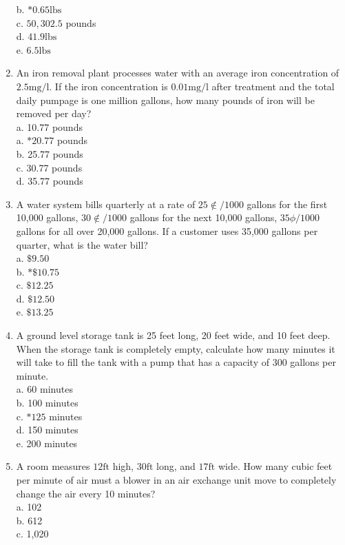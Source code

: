 \begin{enumerate}
b. $* 0.65 \mathrm{lbs}$\\
c. $50,302.5$ pounds\\
d. $41.9 \mathrm{lbs}$\\
e. $6.5 \mathrm{lbs}$\\
\item An iron removal plant processes water with an average iron concentration of $2.5 \mathrm{mg} / \mathrm{l}$. If the iron concentration is $0.01 \mathrm{mg} / \mathrm{l}$ after treatment and the total daily pumpage is one million gallons, how many pounds of iron will be removed per day?\\
a. 10.77 pounds\\
a. $* 20.77$ pounds\\
b. 25.77 pounds\\
c. 30.77 pounds\\
d. 35.77 pounds\\
\item A water system bills quarterly at a rate of $25 \notin / 1000$ gallons for the first 10,000 gallons, $30 \notin / 1000$ gallons for the next 10,000 gallons, $35 \phi / 1000$ gallons for all over 20,000 gallons. If a customer uses 35,000 gallons per quarter, what is the water bill?\\
a. $\$ 9.50$\\
b. $* \$ 10.75$\\
c. $\$ 12.25$\\
d. $\$ 12.50$\\
e. $\$ 13.25$\\
\item A ground level storage tank is 25 feet long, 20 feet wide, and 10 feet deep. When the storage tank is completely empty, calculate how many minutes it will take to fill the tank with a pump that has a capacity of 300 gallons per minute.\\
a. 60 minutes\\
b. 100 minutes\\
c. $* 125$ minutes\\
d. 150 minutes\\
e. 200 minutes\\
\item A room measures $12 \mathrm{ft}$ high, $30 \mathrm{ft}$ long, and $17 \mathrm{ft}$ wide. How many cubic feet per minute of air must a blower in an air exchange unit move to completely change the air every 10 minutes?\\
a. 102\\
b. 612\\
c. 1,020\\

\end{enumerate}
